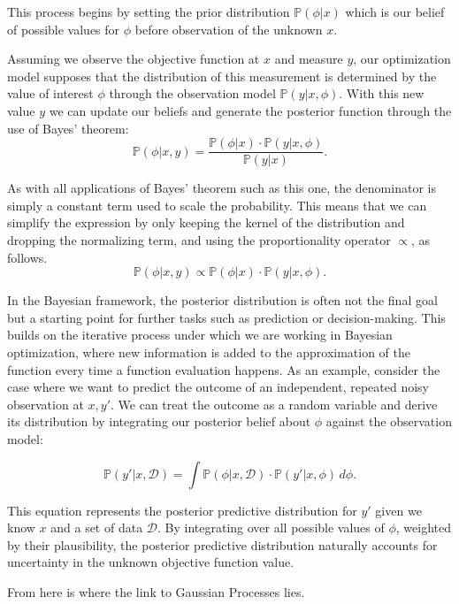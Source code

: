 This process begins by setting the prior distribution $\mathbb{P}(\phi | x)$ which is our belief of possible values for $\phi$ before observation of the unknown $x$. 

Assuming we observe the objective function at $x$ and measure $y$, our optimization model supposes that the distribution of this measurement is determined by the value of interest $\phi$ through the observation model $\mathbb{P}(y | x, \phi)$. With this new value $y$ we can update our beliefs and generate the posterior function through the use of Bayes' theorem: 
\[ \mathbb{P}(\phi | x, y) = \frac{\mathbb{P}(\phi | x) \cdot \mathbb{P}(y | x, \phi)}{\mathbb{P}(y | x)}. \] 

As with all applications of Bayes' theorem such as this one, the denominator is simply a constant term used to scale the probability. This means that we can simplify the expression by only keeping the kernel of the distribution and dropping the normalizing term, and using the proportionality operator $\propto$, as follows. 
\[ \mathbb{P}(\phi | x, y) \propto \mathbb{P}(\phi | x) \cdot \mathbb{P}(y | x, \phi). \] 

In the Bayesian framework, the posterior distribution is often not the final goal but a starting point for further tasks such as prediction or decision-making. This builds on the iterative process under which we are working in Bayesian optimization, where new information is added to the approximation of the function every time a function evaluation happens. As an example, consider the case where we want to predict the outcome of an independent, repeated noisy observation at $x, y'$. We can treat the outcome as a random variable and derive its distribution by integrating our posterior belief about $\phi$ against the observation model:

\[ \mathbb{P}(y' | x, \mathcal{D}) = \int \mathbb{P}(\phi | x, \mathcal{D}) \cdot \mathbb{P}\left(y' | x, \phi\right) \, d \phi. \]

This equation represents the posterior predictive distribution for $y'$ given we know $x$ and a set of data $\mathcal{D}$. By integrating over all possible values of $\phi$, weighted by their plausibility, the posterior predictive distribution naturally accounts for uncertainty in the unknown objective function value.

From here is where the link to Gaussian Processes lies. 














